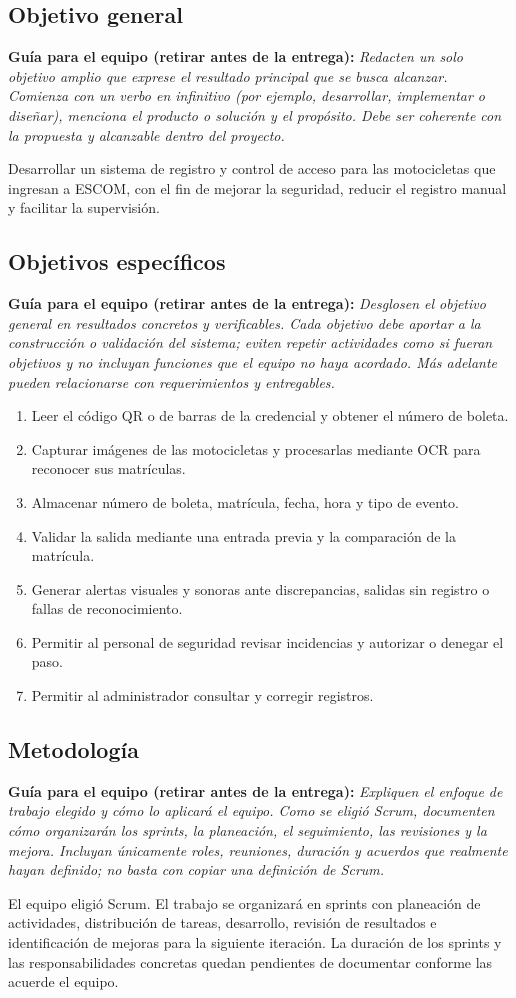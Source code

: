 \documentclass[12pt,letterpaper]{article}
\newcommand{\guia}[1]{\par\smallskip\noindent\textbf{Guía para el equipo (retirar antes de la entrega):} \textit{#1}\par\smallskip}
\begin{document}
\subsection{Objetivo general}
\guia{Redacten un solo objetivo amplio que exprese el resultado principal que se busca alcanzar. Comienza con un verbo en infinitivo (por ejemplo, desarrollar, implementar o diseñar), menciona el producto o solución y el propósito. Debe ser coherente con la propuesta y alcanzable dentro del proyecto.}
Desarrollar un sistema de registro y control de acceso para las motocicletas que ingresan a ESCOM, con el fin de mejorar la seguridad, reducir el registro manual y facilitar la supervisión.
\subsection{Objetivos específicos}
\guia{Desglosen el objetivo general en resultados concretos y verificables. Cada objetivo debe aportar a la construcción o validación del sistema; eviten repetir actividades como si fueran objetivos y no incluyan funciones que el equipo no haya acordado. Más adelante pueden relacionarse con requerimientos y entregables.}
\begin{enumerate}
\item Leer el código QR o de barras de la credencial y obtener el número de boleta.
\item Capturar imágenes de las motocicletas y procesarlas mediante OCR para reconocer sus matrículas.
\item Almacenar número de boleta, matrícula, fecha, hora y tipo de evento.
\item Validar la salida mediante una entrada previa y la comparación de la matrícula.
\item Generar alertas visuales y sonoras ante discrepancias, salidas sin registro o fallas de reconocimiento.
\item Permitir al personal de seguridad revisar incidencias y autorizar o denegar el paso.
\item Permitir al administrador consultar y corregir registros.
\end{enumerate}
\subsection{Metodología}
\guia{Expliquen el enfoque de trabajo elegido y cómo lo aplicará el equipo. Como se eligió Scrum, documenten cómo organizarán los sprints, la planeación, el seguimiento, las revisiones y la mejora. Incluyan únicamente roles, reuniones, duración y acuerdos que realmente hayan definido; no basta con copiar una definición de Scrum.}
El equipo eligió Scrum. El trabajo se organizará en sprints con planeación de actividades, distribución de tareas, desarrollo, revisión de resultados e identificación de mejoras para la siguiente iteración. La duración de los sprints y las responsabilidades concretas quedan pendientes de documentar conforme las acuerde el equipo.
\end{document}
